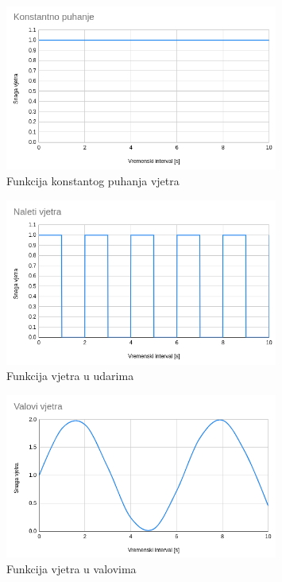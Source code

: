 \documentclass[times, utf8, diplomski]{fer}
\begin{document}
\begin{figure}[h]
	\centering
	\includegraphics[width=0.8\textwidth]{img/43-1}
	\caption{Funkcija konstantog puhanja vjetra}
	\label{fig:43-1}
\end{figure}

\begin{figure}[h]
	\centering
	\includegraphics[width=0.8\textwidth]{img/43-2}
	\caption{Funkcija vjetra u udarima}
	\label{fig:43-2}
\end{figure}

\begin{figure}[h]
	\centering
	\includegraphics[width=0.8\textwidth]{img/43-3}
	\caption{Funkcija vjetra u valovima}
	\label{fig:43-3}
\end{figure}
\end{document}
